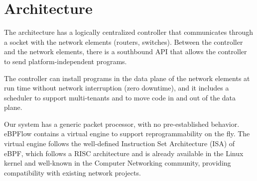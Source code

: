 \section{Architecture}
\label{sec:architecture}


The \system architecture has a logically centralized controller that communicates through a socket with the network elements (\eg routers, switches). 
Between the controller and the network elements, there is a southbound API that allows the controller to send platform-independent programs.

The controller can install programs in the data plane of the network elements at run time without network interruption (zero downtime), and it includes a scheduler to support multi-tenants and to move code in and out of the data plane.





Our system has a generic packet processor, with no pre-established behavior.
eBPFlow contains a virtual engine to support reprogrammability on the fly.
The virtual engine follows the well-defined Instruction Set Architecture (ISA) of eBPF, which follows a RISC architecture and is already available in the Linux kernel and well-known in the Computer Networking community, providing compatibility with existing network projects.


